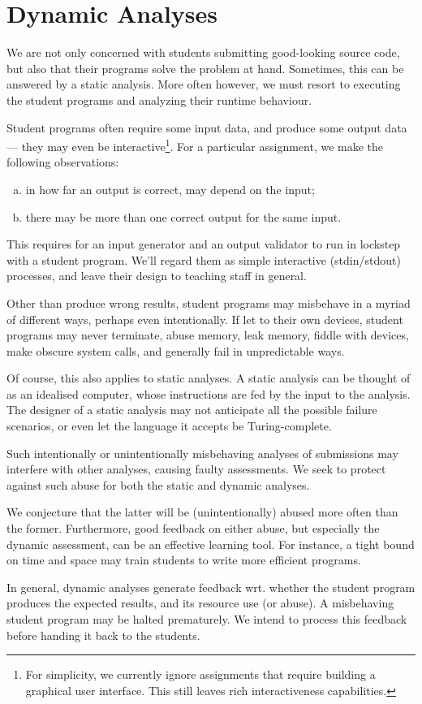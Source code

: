 
\section{Dynamic Analyses}

We are not only concerned with students submitting good-looking source code,
but also that their programs solve the problem at hand. Sometimes, this can be
answered by a static analysis. More often however, we must resort to executing
the student programs and analyzing their runtime behaviour.

Student programs often require some input data, and produce some output data
--- they may even be interactive\footnote{For simplicity, we currently ignore
assignments that require building a graphical user interface. This still leaves
rich interactiveness capabilities.}. For a particular assignment, we make the
following observations:

\begin{enumerate}[(a)]

\item in how far an output is correct, may depend on the input;

\item there may be more than one correct output for the same input.

\end{enumerate}

This requires for an input generator and an output validator to run in lockstep
with a student program. We'll regard them as simple interactive (stdin/stdout)
processes, and leave their design to teaching staff in general.

Other than produce wrong results, student programs may misbehave in a myriad of
different ways, perhaps even intentionally. If let to their own devices,
student programs may never terminate, abuse memory, leak memory, fiddle with
devices, make obscure system calls, and generally fail in unpredictable ways.

Of course, this also applies to static analyses. A static analysis can be
thought of as an idealised computer, whose instructions are fed by the input to
the analysis. The designer of a static analysis may not anticipate all the
possible failure scenarios, or even let the language it accepts be
Turing-complete.

Such intentionally or unintentionally misbehaving analyses of submissions may
interfere with other analyses, causing faulty assessments. We seek to protect
against such abuse for both the static and dynamic analyses.

We conjecture that the latter will be (unintentionally) abused more often than
the former. Furthermore, good feedback on either abuse, but especially the
dynamic assessment, can be an effective learning tool. For instance, a tight
bound on time and space may train students to write more efficient programs.

In general, dynamic analyses generate feedback wrt. whether the student program
produces the expected results, and its resource use (or abuse). A misbehaving
student program may be halted prematurely. We intend to process this feedback
before handing it back to the students.
